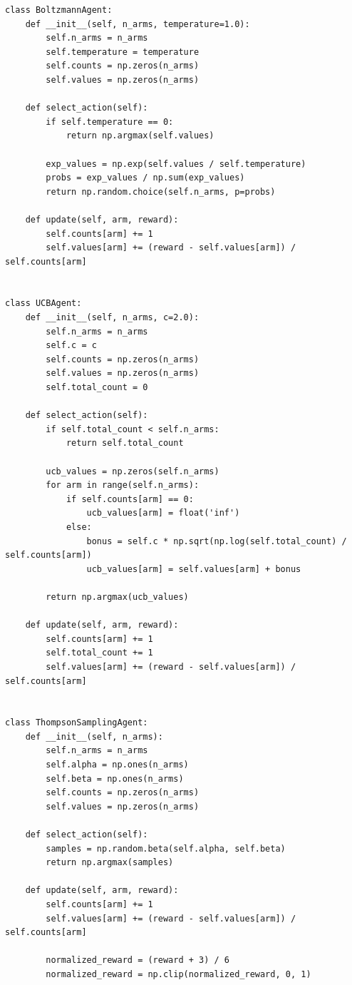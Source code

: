 \documentclass[12pt,a4paper]{article}
\begin{document}
\begin{lstlisting}[caption={强化学习实验完整代码}]
class BoltzmannAgent:
    def __init__(self, n_arms, temperature=1.0):
        self.n_arms = n_arms
        self.temperature = temperature
        self.counts = np.zeros(n_arms)
        self.values = np.zeros(n_arms)
    
    def select_action(self):
        if self.temperature == 0:
            return np.argmax(self.values)
        
        exp_values = np.exp(self.values / self.temperature)
        probs = exp_values / np.sum(exp_values)
        return np.random.choice(self.n_arms, p=probs)
    
    def update(self, arm, reward):
        self.counts[arm] += 1
        self.values[arm] += (reward - self.values[arm]) / self.counts[arm]


class UCBAgent:
    def __init__(self, n_arms, c=2.0):
        self.n_arms = n_arms
        self.c = c
        self.counts = np.zeros(n_arms)
        self.values = np.zeros(n_arms)
        self.total_count = 0
    
    def select_action(self):
        if self.total_count < self.n_arms:
            return self.total_count
        
        ucb_values = np.zeros(self.n_arms)
        for arm in range(self.n_arms):
            if self.counts[arm] == 0:
                ucb_values[arm] = float('inf')
            else:
                bonus = self.c * np.sqrt(np.log(self.total_count) / self.counts[arm])
                ucb_values[arm] = self.values[arm] + bonus
        
        return np.argmax(ucb_values)
    
    def update(self, arm, reward):
        self.counts[arm] += 1
        self.total_count += 1
        self.values[arm] += (reward - self.values[arm]) / self.counts[arm]


class ThompsonSamplingAgent:
    def __init__(self, n_arms):
        self.n_arms = n_arms
        self.alpha = np.ones(n_arms)
        self.beta = np.ones(n_arms)
        self.counts = np.zeros(n_arms)
        self.values = np.zeros(n_arms)
    
    def select_action(self):
        samples = np.random.beta(self.alpha, self.beta)
        return np.argmax(samples)
    
    def update(self, arm, reward):
        self.counts[arm] += 1
        self.values[arm] += (reward - self.values[arm]) / self.counts[arm]
        
        normalized_reward = (reward + 3) / 6
        normalized_reward = np.clip(normalized_reward, 0, 1)
        

\end{lstlisting}
\end{document}
